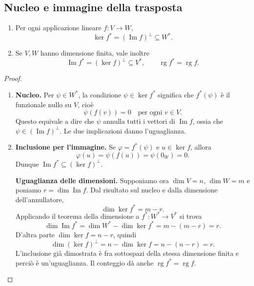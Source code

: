 \subsection{Nucleo e immagine della trasposta}
\begin{teorema}
\begin{enumerate}[label=\arabic*.]
\item Per ogni applicazione lineare $f:V\to W$,
\[
 \ker f^*=(\operatorname{Im}f)^\perp\subseteq W^*.
\]
\item Se $V,W$ hanno dimensione finita, vale inoltre
\[
 \operatorname{Im}f^*=(\ker f)^\perp\subseteq V^*,\qquad
 \operatorname{rg}f^*=\operatorname{rg}f.
\]
\end{enumerate}
\end{teorema}
\begin{proof}
\begin{enumerate}[label=\arabic*.]
\item \textbf{Nucleo.} Per $\psi\in W^*$, la condizione $\psi\in\ker f^*$ significa che $f^*(\psi)$ è il funzionale nullo su $V$, cioè
\[
 \psi(f(v))=0\quad\text{per ogni }v\in V.
\]
Questo equivale a dire che $\psi$ annulla tutti i vettori di $\operatorname{Im}f$, ossia che $\psi\in(\operatorname{Im}f)^\perp$. Le due implicazioni danno l'uguaglianza.
\item \textbf{Inclusione per l'immagine.} Se $\varphi=f^*(\psi)$ e $u\in\ker f$, allora
\[
 \varphi(u)=\psi(f(u))=\psi(0_W)=0.
\]
Dunque $\operatorname{Im}f^*\subseteq(\ker f)^\perp$.

\textbf{Uguaglianza delle dimensioni.} Supponiamo ora $\dim V=n$, $\dim W=m$ e poniamo $r=\dim\operatorname{Im}f$. Dal risultato sul nucleo e dalla dimensione dell'annullatore,
\[
 \dim\ker f^*=m-r.
\]
Applicando il teorema della dimensione a $f^*:W^*\to V^*$ si trova
\[
 \dim\operatorname{Im}f^*=\dim W^*-\dim\ker f^*=m-(m-r)=r.
\]
D'altra parte $\dim\ker f=n-r$, quindi
\[
 \dim(\ker f)^\perp=n-\dim\ker f=n-(n-r)=r.
\]
L'inclusione già dimostrata è fra sottospazi della stessa dimensione finita e perciò è un'uguaglianza. Il conteggio dà anche $\operatorname{rg}f^*=\operatorname{rg}f$.
\end{enumerate}
\end{proof}

